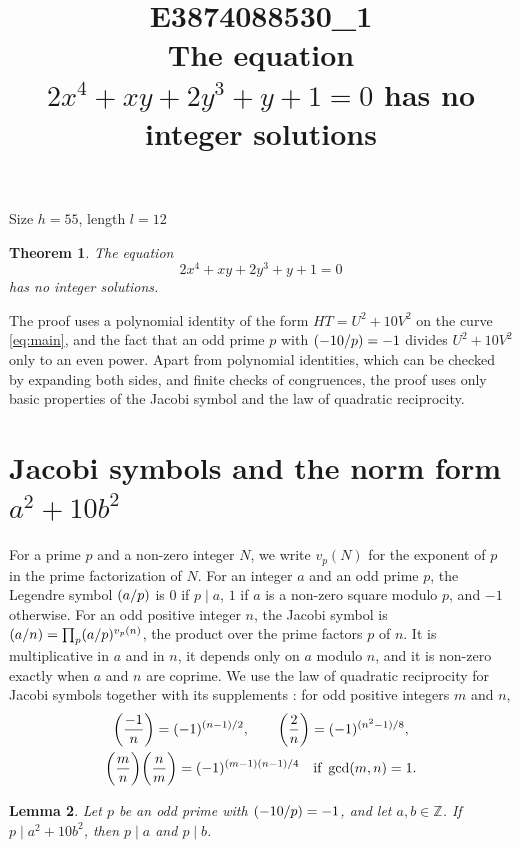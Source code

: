 \documentclass[11pt]{article}
\title{\textbf{E3874088530\_1}\\[4pt] {\Large The equation $2x^{4}+xy+2y^{3}+y+1=0$ has no integer solutions}}
\author{}
\date{}
\newtheorem{theorem}{Theorem}
\newtheorem{lemma}[theorem]{Lemma}
\newcommand{\Z}{\mathbb{Z}}
\newcommand{\leg}[2]{\mathchoice{\biggl(\dfrac{#1}{#2}\biggr)}{(#1/#2)}{(#1/#2)}{(#1/#2)}}
\begin{document}
\maketitle
\vspace{-8ex}
\begin{center}
Size $h=55$, length $l=12$
\end{center}

\begin{theorem}\label{thm:main}
The equation
\begin{equation}\label{eq:main}
2x^{4}+xy+2y^{3}+y+1=0
\end{equation}
has no integer solutions.
\end{theorem}

The proof uses a polynomial identity of the form $HT=U^2+10V^2$ on the curve \eqref{eq:main}, and the fact that an odd prime $p$ with $\leg{-10}{p}=-1$ divides $U^2+10V^2$ only to an even power. Apart from polynomial identities, which can be checked by expanding both sides, and finite checks of congruences, the proof uses only basic properties of the Jacobi symbol and the law of quadratic reciprocity.

\section{\texorpdfstring{Jacobi symbols and the norm form $a^2+10b^2$}{Jacobi symbols and the norm form}}

For a prime $p$ and a non-zero integer $N$, we write $v_p(N)$ for the exponent of $p$ in the prime factorization of $N$. For an integer $a$ and an odd prime $p$, the Legendre symbol $\leg{a}{p}$ is $0$ if $p\mid a$, $1$ if $a$ is a non-zero square modulo $p$, and $-1$ otherwise. For an odd positive integer $n$, the Jacobi symbol is $\leg{a}{n}=\prod_p\leg{a}{p}^{v_p(n)}$, the product over the prime factors $p$ of $n$. It is multiplicative in $a$ and in $n$, it depends only on $a$ modulo $n$, and it is non-zero exactly when $a$ and $n$ are coprime. We use the law of quadratic reciprocity for Jacobi symbols together with its supplements \cite[Chapter~5, \S2]{IR}: for odd positive integers $m$ and $n$,
\begin{gather*}
\leg{-1}{n}=(-1)^{(n-1)/2},\qquad\leg{2}{n}=(-1)^{(n^2-1)/8},\\
\leg{m}{n}\leg{n}{m}=(-1)^{(m-1)(n-1)/4}\quad\text{if }\gcd(m,n)=1.
\end{gather*}

\begin{lemma}\label{lem:divides}
Let $p$ be an odd prime with $\leg{-10}{p}=-1$, and let $a,b\in\Z$. If $p\mid a^2+10b^2$, then $p\mid a$ and $p\mid b$.
\end{lemma}
\end{document}
